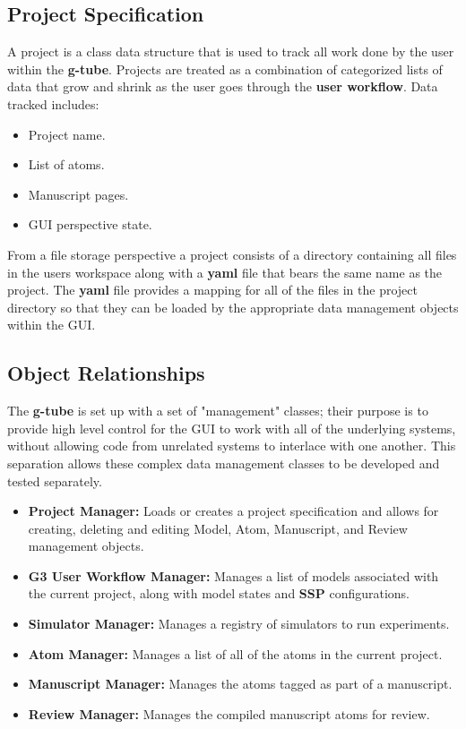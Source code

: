 \documentclass[12pt]{article}
\begin{document}
\subsection*{Project Specification}

	A project is a class data structure that is used to track all work done by the user within the {\bf g-tube}. Projects are treated as a combination of categorized lists of data that grow and shrink as the user goes through the {\bf user workflow}. Data tracked includes:
	
\begin{itemize}
	\item[] Project name.
	\item[] List of atoms.
	\item[] Manuscript pages.
	\item[] GUI perspective state.
\end{itemize}

From a file storage perspective a project consists of a directory containing all files in the users workspace along with a {\bf yaml} file that bears the same name as the project. The {\bf yaml} file provides a mapping for all of the files in the project directory so that they can be loaded by the appropriate data management objects within the GUI.

\subsection*{Object Relationships}

	The {\bf g-tube} is set up with a set of "management" classes; their purpose is to provide high level control for the GUI to work with all of the underlying systems, without allowing code from unrelated systems to interlace with one another. This separation allows these complex data management classes to be developed and tested separately.

\begin{itemize}
	\item[] {\bf Project Manager:} Loads or creates a project specification and allows for creating, deleting and editing Model, Atom, Manuscript, and Review management objects.
	\item[] {\bf G3 User Workflow Manager:} Manages a list of models associated with the current project, along with model states and {\bf SSP} configurations.
	\item[] {\bf Simulator Manager:} Manages a registry of simulators to run experiments.
	\item[] {\bf Atom Manager:} Manages a list of all of the atoms in the current project. 
	\item[] {\bf Manuscript Manager:} Manages the atoms tagged as part of a manuscript.
	\item[] {\bf Review Manager:} Manages the compiled manuscript atoms for review.
\end{itemize}
\end{document}
